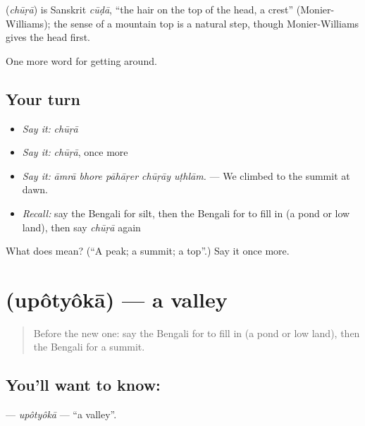 \begin{cousinweb}
\textbf{} (\emph{chūṛā}) is Sanskrit \emph{cūḍā}, \textquotedblleft{}the hair on the top of the head, a crest\textquotedblright{} (Monier-Williams); the sense of a mountain top is a natural step, though Monier-Williams gives the head first.
\end{cousinweb}

\begin{grammarlens}[title={What you've built}]
One more word for getting around.
\end{grammarlens}

\subsection*{Your turn}
\begin{itemize}
\raggedright
  \item \emph{Say it:} \emph{chūṛā}
  \item \emph{Say it:} \emph{chūṛā}, once more
  \item \emph{Say it:} \emph{āmrā bhore pāhāṛer chūṛāy uṭhlām.} — We climbed to the summit at dawn.
  \item \emph{Recall:} say the Bengali for silt, then the Bengali for to fill in (a pond or low land), then say \emph{chūṛā} again
\end{itemize}

\begin{tcolorbox}[breakable,colback=teal!4,colframe=teal!35!black,title={Before you move on}]
What does  mean? (\textquotedblleft{}A peak; a summit; a top\textquotedblright{}.) Say it once more.
\end{tcolorbox}
\section[\texorpdfstring{\bn{উপত্যকা} (upôtyôkā)}{উপত্যকা (upôtyôkā)}]{ (upôtyôkā) — a valley}

\label{lesson:BN-C432-upotyoka}



\begin{quote}
Before the new one: say the Bengali for to fill in (a pond or low land), then the Bengali for a summit.
\end{quote}

\subsection*{You'll want to know: }
\textbf{} — \emph{upôtyôkā} — \textquotedblleft{}a valley\textquotedblright{}.

